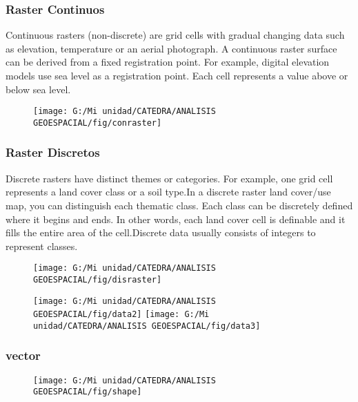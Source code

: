 \documentclass[14pt]{beamer}
\begin{document}
\begin{frame}
\frametitle{Raster Continuos}
\scriptsize{Continuous rasters (non-discrete) are grid cells with gradual changing data such as elevation, temperature or an aerial photograph. A continuous raster surface can be derived from a fixed registration point. For example, digital elevation models use sea level as a registration point. Each cell represents a value above or below sea level.}
  \begin{figure}
    \centering
    \texttt{[image: G:/Mi unidad/CATEDRA/ANALISIS GEOESPACIAL/fig/conraster]}
  \end{figure}
\end{frame}
\begin{frame}
\frametitle{Raster Discretos}
\scriptsize{Discrete rasters have distinct themes or categories. For example, one grid cell represents a land cover class or a soil type.In a discrete raster land cover/use map, you can distinguish each thematic class. Each class can be discretely defined where it begins and ends. In other words, each land cover cell is definable and it fills the entire area of the cell.Discrete data usually consists of integers to represent classes.}
  \begin{figure}
    \centering
    \texttt{[image: G:/Mi unidad/CATEDRA/ANALISIS GEOESPACIAL/fig/disraster]}
  \end{figure}
\end{frame}
\begin{frame}
  \begin{figure}
    \centering
    \texttt{[image: G:/Mi unidad/CATEDRA/ANALISIS GEOESPACIAL/fig/data2]}
    \texttt{[image: G:/Mi unidad/CATEDRA/ANALISIS GEOESPACIAL/fig/data3]}
  \end{figure}
\end{frame}
\begin{frame}
\frametitle{vector}
  \begin{figure}
    \centering
    \texttt{[image: G:/Mi unidad/CATEDRA/ANALISIS GEOESPACIAL/fig/shape]}
  \end{figure}
\end{frame}
\end{document}
